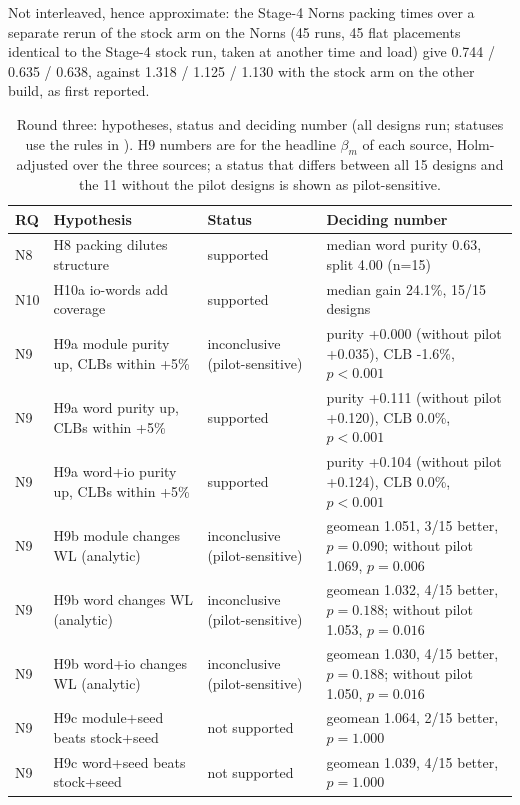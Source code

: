 Not interleaved, hence approximate: the Stage-4 Norns packing times over a separate rerun of the stock arm
on the Norns  (45 runs, 45 flat placements identical to the Stage-4 stock run, taken at another time and load) give 0.744 / 0.635 / 0.638,
against 1.318 / 1.125 / 1.130 with the stock arm on the other build, as first reported.


\begin{table}[t]
\caption{Round three: hypotheses, status and deciding number (all designs run; statuses use the rules in
). H9 numbers are for the headline $\beta_m$ of each source, Holm-adjusted over the three sources;
a status that differs between all 15 designs and the 11 without the pilot designs is shown as pilot-sensitive.}
\label{tab:r3status}
\centering
\footnotesize\setlength{\tabcolsep}{4pt}
\begin{tabular}{@{}lp{5.4cm}p{3.4cm}p{6.6cm}@{}}
\toprule
RQ & Hypothesis & Status & Deciding number \\
\midrule
N8 & H8 packing dilutes structure & supported & median word purity 0.63, split 4.00 (n=15) \\
N10 & H10a io-words add coverage & supported & median gain 24.1\%, 15/15 designs \\
N9 & H9a module purity up, CLBs within +5\% & inconclusive (pilot-sensitive) & purity +0.000 (without pilot +0.035), CLB -1.6\%, $p<0.001$ \\
N9 & H9a word purity up, CLBs within +5\% & supported & purity +0.111 (without pilot +0.120), CLB 0.0\%, $p<0.001$ \\
N9 & H9a word+io purity up, CLBs within +5\% & supported & purity +0.104 (without pilot +0.124), CLB 0.0\%, $p<0.001$ \\
N9 & H9b module changes WL (analytic) & inconclusive (pilot-sensitive) & geomean 1.051, 3/15 better, $p=0.090$; without pilot 1.069, $p=0.006$ \\
N9 & H9b word changes WL (analytic) & inconclusive (pilot-sensitive) & geomean 1.032, 4/15 better, $p=0.188$; without pilot 1.053, $p=0.016$ \\
N9 & H9b word+io changes WL (analytic) & inconclusive (pilot-sensitive) & geomean 1.030, 4/15 better, $p=0.188$; without pilot 1.050, $p=0.016$ \\
N9 & H9c module+seed beats stock+seed & not supported & geomean 1.064, 2/15 better, $p=1.000$ \\
N9 & H9c word+seed beats stock+seed & not supported & geomean 1.039, 4/15 better, $p=1.000$ \\

\end{tabular}
\end{table}
